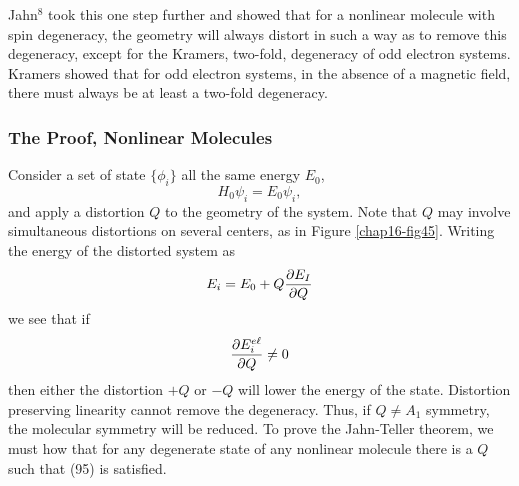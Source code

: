 Jahn$^8$ took this one step further and showed that for a nonlinear 
molecule with spin degeneracy, the geometry will always distort in 
such a way as to remove this degeneracy, except for the Kramers, 
two-fold, degeneracy of odd electron systems.  Kramers showed that for 
odd electron systems, in the absence of a magnetic field, there must 
always be at least a two-fold degeneracy.

\subsubsection{The Proof, Nonlinear Molecules}

Consider a set of state $\{ \phi_i\}$ all the same energy $E_0$,
\begin{equation}
H_0 \psi_i = E_0 \psi_i ,
\label{chap16-eqno93}
\end{equation}
and apply a distortion $Q$ to the geometry of the system.  Note that
$Q$ may involve simultaneous distortions on several centers, as in
Figure \ref{chap16-fig45}.  Writing the energy of the distorted system
as
\begin{equation}
E_i = E_0 + Q {\partial E_I \over \partial Q}
\label{chap16-eqno94}
\end{equation}
we see that if
\begin{equation}
{\partial E_i^{e\ell} \over \partial Q} \not= 0
\label{chap16-eqno95}
\end{equation}
then either the distortion $+Q$ or $-Q$ will lower the energy of the 
state.  Distortion preserving linearity cannot remove the degeneracy.  
Thus, if $Q \not= A_1$ symmetry, the molecular symmetry will be 
reduced.  To prove the Jahn-Teller theorem, we must how that for any 
degenerate state of any nonlinear molecule there is a $Q$ such that 
(95) is satisfied.

